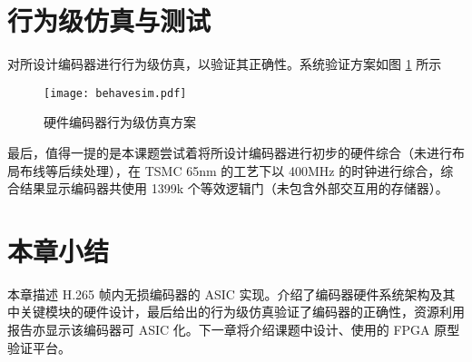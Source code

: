 \section{行为级仿真与测试}
对所设计编码器进行行为级仿真，以验证其正确性。系统验证方案如图 \ref{fig:behavesim} 所示
\begin{figure}[hbt]
    \centering
    \texttt{[image: behavesim.pdf]}
    \caption{硬件编码器行为级仿真方案}
    \label{fig:behavesim}
\end{figure}

最后，值得一提的是本课题尝试着将所设计编码器进行初步的硬件综合（未进行布局布线等后续处理），在 TSMC 65nm 的工艺下以 400MHz 的时钟进行综合，综合结果显示编码器共使用 1399k 个等效逻辑门（未包含外部交互用的存储器）。

\section{本章小结}
本章描述 H.265 帧内无损编码器的 ASIC 实现。介绍了编码器硬件系统架构及其中关键模块的硬件设计，最后给出的行为级仿真验证了编码器的正确性，资源利用报告亦显示该编码器可 ASIC 化。下一章将介绍课题中设计、使用的 FPGA 原型验证平台。